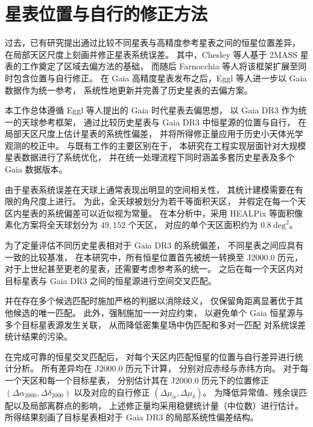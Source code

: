 \section{星表位置与自行的修正方法}
过去，已有研究提出通过比较不同星表与高精度参考星表之间的恒星位置差异，
在局部天区尺度上刻画并修正星表系统误差。
其中，Chesley 等人基于 2MASS 星表的工作奠定了区域去偏方法的基础，
而随后 Farnocchia 等人将该框架扩展至同时包含位置与自行修正。
在 Gaia 高精度星表发布之后，Eggl 等人进一步以 Gaia 数据作为统一参考，
系统性地更新并完善了历史星表的去偏方案。

本工作总体遵循 Eggl 等人提出的 Gaia 时代星表去偏思想，
以 Gaia DR3 作为统一的天球参考框架，
通过比较历史星表与 Gaia DR3 中恒星源的位置与自行，
在局部天区尺度上估计星表的系统性偏差，
并将所得修正量应用于历史小天体光学观测的校正中。
与既有工作的主要区别在于，
本研究在工程实现层面针对大规模星表数据进行了系统优化，
并在统一处理流程下同时涵盖多套历史星表及多个 Gaia 数据版本。

由于星表系统误差在天球上通常表现出明显的空间相关性，
其统计建模需要在有限的角尺度上进行。
为此，全天球被划分为若干等面积天区，
并假定在每一个天区内星表的系统偏差可以近似视为常量。
在本分析中，采用 HEALPix 等面积像素化方案将全天球划分为 $49{,}152$ 个天区，
对应的单个天区面积约为 $0.8~\mathrm{deg}^2$。

为了定量评估不同历史星表相对于 Gaia DR3 的系统偏差，
不同星表之间应具有一致的比较基准，
在本研究中，所有恒星位置首先被统一转换至 J2000.0 历元，
对于上世纪甚至更老的星表，还需要考虑参考系的统一。
之后在每一个天区内对目标星表与 Gaia DR3 之间的恒星源进行空间交叉匹配。


并在存在多个候选匹配时施加严格的判据以消除歧义，
仅保留角距离显著优于其他候选的唯一匹配。
此外，强制施加一一对应约束，
以避免单个 Gaia 恒星源与多个目标星表源发生关联，
从而降低密集星场中伪匹配和多对一匹配
对系统误差统计结果的污染。

在完成可靠的恒星交叉匹配后，
对每个天区内匹配恒星的位置与自行差异进行统计分析。
所有差异均在 J2000.0 历元下计算，
分别对应赤经与赤纬方向。
对于每一个天区和每一个目标星表，
分别估计其在 J2000.0 历元下的位置修正
$(\Delta\alpha_{2000}, \Delta\delta_{2000})$
以及对应的自行修正
$(\Delta\mu_{\alpha}, \Delta\mu_{\delta})$。
为降低异常值、残余误匹配以及局部离群点的影响，
上述修正量均采用稳健统计量（中位数）进行估计。
所得结果刻画了目标星表相对于 Gaia DR3 的局部系统性偏差结构。

